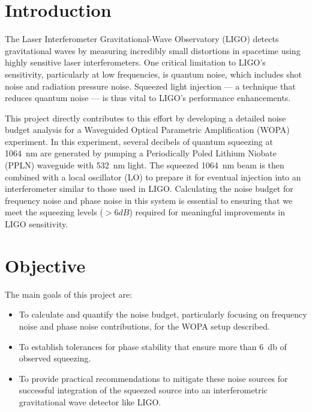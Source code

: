 \documentclass[colorlinks=true,pdfstartview=FitV,linkcolor=blue,
citecolor=red,urlcolor=magenta]{ligodoc}
\title{}
\author{}
\begin{document}
\tableofcontents

\newpage
\section{Introduction}
The Laser Interferometer Gravitational-Wave Observatory (LIGO) detects gravitational waves by measuring incredibly small distortions in spacetime using highly sensitive laser interferometers. One critical limitation to LIGO’s sensitivity, particularly at low frequencies, is quantum noise, which includes shot noise and radiation pressure noise. Squeezed light injection — a technique that reduces quantum noise — is thus vital to LIGO's performance enhancements.

This project directly contributes to this effort by developing a detailed noise budget analysis for a Waveguided Optical Parametric Amplification (WOPA) experiment. In this experiment, several decibels of quantum squeezing at \SI{1064}{\nano\meter} are generated by pumping a Periodically Poled Lithium Niobate (PPLN) waveguide with \SI{532}{\nano\meter} light. The squeezed \SI{1064}{\nano\meter} beam is then combined with a local oscillator (LO) to prepare it for eventual injection into an interferometer similar to those used in LIGO. Calculating the noise budget for frequency noise and phase noise in this system is essential to ensuring that we meet the squeezing levels ($> 6 dB$) required for meaningful improvements in LIGO sensitivity.

\section{Objective}
The main goals of this project are:

\begin{itemize}
    \item To calculate and quantify the noise budget, particularly focusing on frequency noise and phase noise contributions, for the WOPA setup described.
    \item To establish tolerances for phase stability that ensure more than \SI{6}{\decibel} of observed squeezing.
    \item To provide practical recommendations to mitigate these noise sources for successful integration of the squeezed source into an interferometric gravitational wave detector like LIGO.
\end{itemize}
\end{document}
